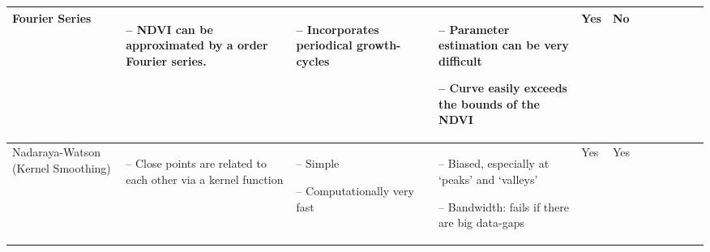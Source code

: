 \begin{table}[!ht]
\begin{tabular}{p{1.6cm}p{3.3cm}p{3.3cm}p{3.4cm}p{0.4cm}p{0.4cm}p{3cm}p{3cm}p{3cm}p{3cm}p{2.7cm}p{3cm}|}
		Fourier Series                                                                                                                                              &
		\begin{cptitemize} \item[--]  NDVI can be approximated by a \nth{2} order Fourier series.                            \end{cptitemize}        &
		\begin{cptitemize} \item[--]  Incorporates periodical growth-cycles                                 \end{cptitemize}        &
		\begin{cptitemize} \item[--]  Parameter estimation can be very difficult \item[--]  Curve easily exceeds the bounds of the NDVI             \end{cptitemize}        &
		Yes                                                                                                                                                          &
		No                                                                                                                                                         \\ \hline%

		Nadaraya-Watson (Kernel Smoothing)                                                                                                                                  &
		\begin{cptitemize} \item[--]  Close points are related to each other via a kernel function \end{cptitemize}                                                                                                                                                            &
		\begin{cptitemize} \item[--]  Simple  \item[--]  Computationally very fast                                                             \end{cptitemize}        &
		\begin{cptitemize} \item[--]  Biased, especially at `peaks' and `valleys'   \item[--]  Bandwidth: fails if there are big data-gaps                                                     \end{cptitemize}               &
		Yes                                                                                                                                                          &
		Yes                                                                                                                                                            \\ \hline%


\end{tabular}
\end{table}
